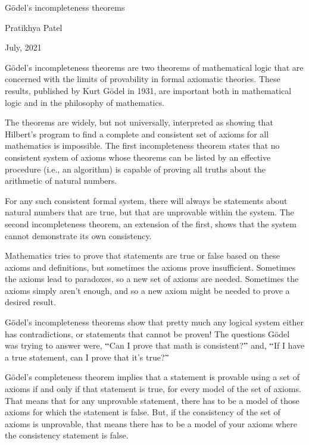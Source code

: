 \documentclass[11pt]{article}
\begin{document}
\begin{center}
{\huge Gödel's incompleteness theorems}
\end{center}


\begin{center}
{\large Pratikhya Patel}
\end{center}


\begin{center}
{\large July, 2021}
\end{center}


{\Large Gödel's incompleteness theorems are two theorems of mathematical logic that are concerned with the limits of provability in formal axiomatic theories. These results, published by Kurt Gödel in 1931, are important both in mathematical logic and in the philosophy of mathematics.\par}

{\Large  The theorems are widely, but not universally, interpreted as showing that Hilbert's program to find a complete and consistent set of axioms for all mathematics is impossible. The first incompleteness theorem states that no consistent system of axioms whose theorems can be listed by an effective procedure (i.e., an algorithm) is capable of proving all truths about the arithmetic of natural numbers.\par}

{\Large  For any such consistent formal system, there will always be statements about natural numbers that are true, but that are unprovable within the system. The second incompleteness theorem, an extension of the first, shows that the system cannot demonstrate its own consistency. \par}

{\Large Mathematics tries to prove that statements are true or false based on these axioms and definitions, but sometimes the axioms prove insufficient. Sometimes the axioms lead to paradoxes, so a new set of axioms are needed. Sometimes the axioms simply aren’t enough, and so a new axiom might be needed to prove a desired result.\par}

{\Large  Gödel’s incompleteness theorems show that pretty much any logical system either has contradictions, or statements that cannot be proven! The questions Gödel was trying to answer were, $``$Can I prove that math is consistent?$"$ and, $``$If I have a true statement, can I prove that it’s true?$"$\par}

{\Large Gödel’s completeness theorem implies that a statement is provable using a set of axioms if and only if that statement is true, for every model of the set of axioms. That means that for any unprovable statement, there has to be a model of those axioms for which the statement is false. But, if the consistency of the set of axioms is unprovable, that means there has to be a model of your axioms where the consistency statement is false.\par}
\end{document}
